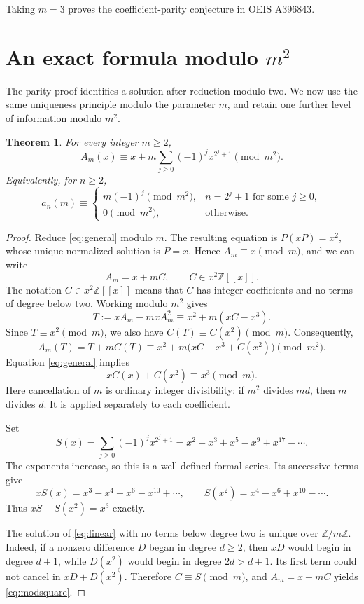 \documentclass[11pt,a4paper]{article}
\newtheorem{theorem}{Theorem}[section]
\theoremstyle{remark}\newtheorem{remark}[theorem]{Remark}
\newcommand{\Z}{\mathbb Z}
\begin{document}
Taking $m=3$ proves the coefficient-parity conjecture in OEIS A396843.

\section{An exact formula modulo \texorpdfstring{$m^2$}{m squared}}

The parity proof identifies a solution after reduction modulo two. We now
use the same uniqueness principle modulo the parameter $m$, and retain
one further level of information modulo $m^2$.

\begin{theorem}\label{thm:modsquare}
For every integer $m\ge2$,
\begin{equation}\label{eq:modsquare}
 A_m(x)\equiv x+m\sum_{j\ge0}(-1)^jx^{2^j+1}\pmod{m^2}.
\end{equation}
Equivalently, for $n\ge2$,
\begin{equation}\label{eq:coeffmod}
 a_n(m)\equiv
 \begin{cases}
   m(-1)^j\pmod{m^2},&n=2^j+1\text{ for some }j\ge0,\\
   0\pmod{m^2},&\text{otherwise}.
 \end{cases}
\end{equation}
\end{theorem}

\begin{proof}
Reduce \eqref{eq:general} modulo $m$. The resulting equation is
$P(xP)=x^2$, whose unique normalized solution is $P=x$.
Hence $A_m\equiv x\pmod m$, and we can write
\[
 A_m=x+mC,\qquad C\in x^2\Z[[x]].
\]
The notation $C\in x^2\Z[[x]]$ means that $C$ has integer coefficients
and no terms of degree below two. Working modulo $m^2$ gives
\[
 T:=xA_m-mxA_m^2
 \equiv x^2+m(xC-x^3).
\]
Since $T\equiv x^2\pmod m$, we also have
$C(T)\equiv C(x^2)\pmod m$. Consequently,
\[
 A_m(T)=T+mC(T)
 \equiv x^2+m\bigl(xC-x^3+C(x^2)\bigr)\pmod{m^2}.
\]
Equation \eqref{eq:general} implies
\begin{equation}\label{eq:linear}
 xC(x)+C(x^2)\equiv x^3\pmod m.
\end{equation}
Here cancellation of $m$ is ordinary integer divisibility: if $m^2$ divides
$md$, then $m$ divides $d$. It is applied separately to each coefficient.

Set
\[
 S(x)=\sum_{j\ge0}(-1)^jx^{2^j+1}
 =x^2-x^3+x^5-x^9+x^{17}-\cdots.
\]
The exponents increase, so this is a well-defined formal series. Its
successive terms give
\[
 xS(x)=x^3-x^4+x^6-x^{10}+\cdots,\qquad
 S(x^2)=x^4-x^6+x^{10}-\cdots.
\]
Thus $xS+S(x^2)=x^3$ exactly.

The solution of \eqref{eq:linear} with no terms below degree two is unique
over $\Z/m\Z$. Indeed, if a nonzero difference $D$ began in degree
$d\ge2$, then $xD$ would begin in degree $d+1$, while $D(x^2)$ would
begin in degree $2d>d+1$. Its first term could not cancel in
$xD+D(x^2)$. Therefore $C\equiv S\pmod m$, and
$A_m=x+mC$ yields \eqref{eq:modsquare}.
\end{proof}
\end{document}
